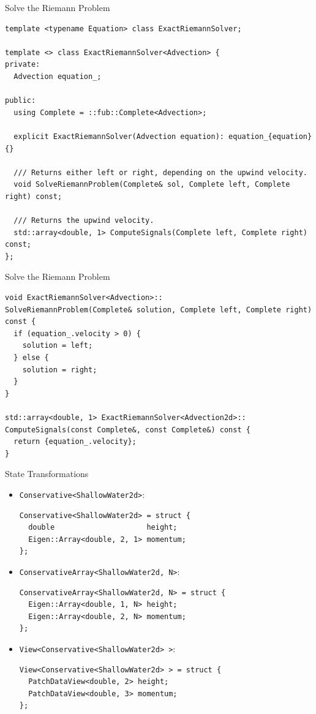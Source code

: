 \documentclass[ucs,9pt]{beamer}
\begin{document}
\begin{frame}[fragile]{Solve the Riemann Problem}
\begin{lstlisting}
template <typename Equation> class ExactRiemannSolver;

template <> class ExactRiemannSolver<Advection> {
private:
  Advection equation_;

public:
  using Complete = ::fub::Complete<Advection>;

  explicit ExactRiemannSolver(Advection equation): equation_{equation} {}

  /// Returns either left or right, depending on the upwind velocity.
  void SolveRiemannProblem(Complete& sol, Complete left, Complete right) const;

  /// Returns the upwind velocity.
  std::array<double, 1> ComputeSignals(Complete left, Complete right) const;
};
\end{lstlisting}
\end{frame}

\begin{frame}[fragile]{Solve the Riemann Problem}
\begin{lstlisting}
void ExactRiemannSolver<Advection>::
SolveRiemannProblem(Complete& solution, Complete left, Complete right) const {
  if (equation_.velocity > 0) {
    solution = left;
  } else {
    solution = right;
  }
}

std::array<double, 1> ExactRiemannSolver<Advection2d>::
ComputeSignals(const Complete&, const Complete&) const {
  return {equation_.velocity};
}
\end{lstlisting}
\end{frame}

\begin{frame}[fragile]{State Transformations}
\begin{itemize}
	\item \texttt{Conservative<ShallowWater2d>}:
\begin{lstlisting}
Conservative<ShallowWater2d> = struct { 
  double                     height;
  Eigen::Array<double, 2, 1> momentum; 
};
\end{lstlisting}
  
  \item \texttt{ConservativeArray<ShallowWater2d, N>}:
\begin{lstlisting}
ConservativeArray<ShallowWater2d, N> = struct { 
  Eigen::Array<double, 1, N> height;
  Eigen::Array<double, 2, N> momentum; 
};
\end{lstlisting}

  \item \texttt{View<Conservative<ShallowWater2d> >}:
\begin{lstlisting}
View<Conservative<ShallowWater2d> > = struct { 
  PatchDataView<double, 2> height;
  PatchDataView<double, 3> momentum; 
};
\end{lstlisting}
\end{itemize}
\end{frame}
\end{document}
